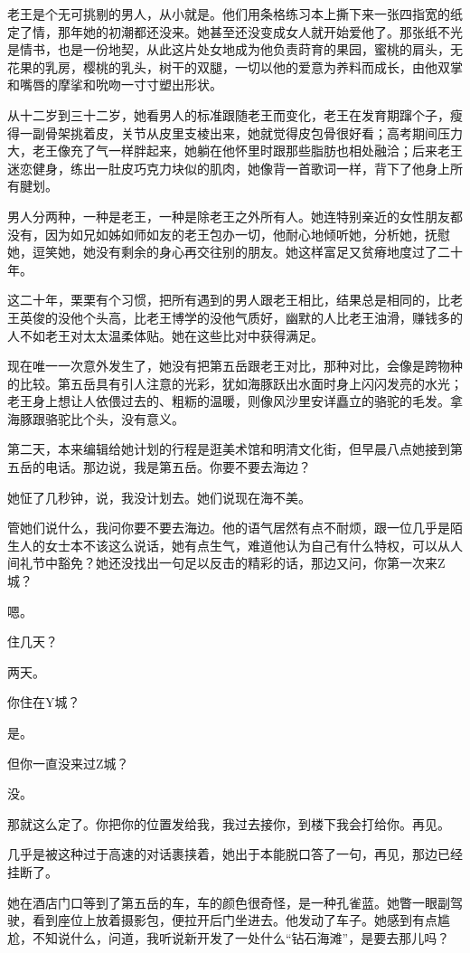 \documentclass[lang=cn,newtx,12pt,scheme=chinese]{elegantbook}
\begin{document}
老王是个无可挑剔的男人，从小就是。他们用条格练习本上撕下来一张四指宽的纸定了情，那年她的初潮都还没来。她甚至还没变成女人就开始爱他了。那张纸不光是情书，也是一份地契，从此这片处女地成为他负责莳育的果园，蜜桃的肩头，无花果的乳房，樱桃的乳头，树干的双腿，一切以他的爱意为养料而成长，由他双掌和嘴唇的摩挲和吮吻一寸寸塑出形状。

从十二岁到三十二岁，她看男人的标准跟随老王而变化，老王在发育期蹿个子，瘦得一副骨架挑着皮，关节从皮里支棱出来，她就觉得皮包骨很好看；高考期间压力大，老王像充了气一样胖起来，她躺在他怀里时跟那些脂肪也相处融洽；后来老王迷恋健身，练出一肚皮巧克力块似的肌肉，她像背一首歌词一样，背下了他身上所有腱划。

男人分两种，一种是老王，一种是除老王之外所有人。她连特别亲近的女性朋友都没有，因为如兄如姊如师如友的老王包办一切，他耐心地倾听她，分析她，抚慰她，逗笑她，她没有剩余的身心再交往别的朋友。她这样富足又贫瘠地度过了二十年。

这二十年，栗栗有个习惯，把所有遇到的男人跟老王相比，结果总是相同的，比老王英俊的没他个头高，比老王博学的没他气质好，幽默的人比老王油滑，赚钱多的人不如老王对太太温柔体贴。她在这些比对中获得满足。

现在唯一一次意外发生了，她没有把第五岳跟老王对比，那种对比，会像是跨物种的比较。第五岳具有引人注意的光彩，犹如海豚跃出水面时身上闪闪发亮的水光；老王身上想让人依偎过去的、粗粝的温暖，则像风沙里安详矗立的骆驼的毛发。拿海豚跟骆驼比个头，没有意义。

第二天，本来编辑给她计划的行程是逛美术馆和明清文化街，但早晨八点她接到第五岳的电话。那边说，我是第五岳。你要不要去海边？

她怔了几秒钟，说，我没计划去。她们说现在海不美。

管她们说什么，我问你要不要去海边。他的语气居然有点不耐烦，跟一位几乎是陌生人的女士本不该这么说话，她有点生气，难道他认为自己有什么特权，可以从人间礼节中豁免？她还没找出一句足以反击的精彩的话，那边又问，你第一次来Z城？

嗯。

住几天？

两天。

你住在Y城？

是。

但你一直没来过Z城？

没。

那就这么定了。你把你的位置发给我，我过去接你，到楼下我会打给你。再见。

几乎是被这种过于高速的对话裹挟着，她出于本能脱口答了一句，再见，那边已经挂断了。

她在酒店门口等到了第五岳的车，车的颜色很奇怪，是一种孔雀蓝。她瞥一眼副驾驶，看到座位上放着摄影包，便拉开后门坐进去。他发动了车子。她感到有点尴尬，不知说什么，问道，我听说新开发了一处什么“钻石海滩”，是要去那儿吗？
\end{document}
